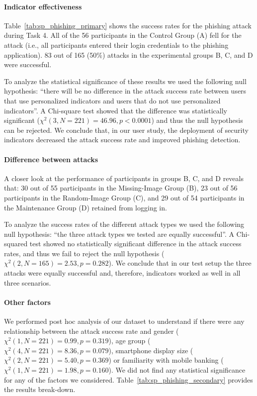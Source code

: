 \paragraph{Indicator effectiveness} Table~\ref{tab:sp_phishing_primary} shows the success rates for the phishing attack during Task 4.
All of the 56 participants in the Control Group (A) fell for the attack (i.e., all participants entered their login credentials to the phishing application).
83 out of 165 (50\%) attacks in the experimental groups B, C, and D were successful.

To analyze the statistical significance of these results we used the following
null hypothesis: ``there will be no difference in the attack success rate between users that use personalized indicators and users that do not use personalized indicators''. A Chi-square test showed that the difference was statistically
significant ($\chi^2(3,N = 221) = 46.96, p < 0.0001$) and thus the null hypothesis
can be rejected. We conclude that, in our user study, the deployment of security indicators decreased the attack success rate and improved phishing detection.

\paragraph{Difference between attacks}
A closer look at the performance of participants in groups B, C, and D reveals that:
30 out of 55 participants in the Missing-Image Group (B),
23 out of 56 participants in the Random-Image Group (C), and
29 out of 54 participants in the Maintenance Group (D) retained from logging in.

To analyze the success rates of the different attack types we used the
following null hypothesis:
``the three attack types we tested are equally successful''.
A Chi-squared test showed no statistically
significant difference in the attack success rates, and
thus we fail to reject the null hypothesis ($\chi^2(2,N = 165) = 2.53, p = 0.282$).
We conclude that in our test setup the three attacks were equally successful and, therefore, indicators worked as well in all three scenarios.

\paragraph{Other factors} We performed post hoc analysis of our dataset to
understand if there were any relationship between the attack success rate and
gender ($\chi^2(1,N = 221) = 0.99, p = 0.319$), age group ($\chi^2(4,N = 221) =
8.36, p = 0.079$), smartphone display size ($\chi^2(2,N = 221) = 5.40, p =
0.369$) or familiarity with mobile banking ($\chi^2(1,N = 221) = 1.98, p =
0.160$). We did not find any statistical significance for any of the factors we
considered. Table~\ref{tab:sp_phishing_secondary} provides the results break-down.

